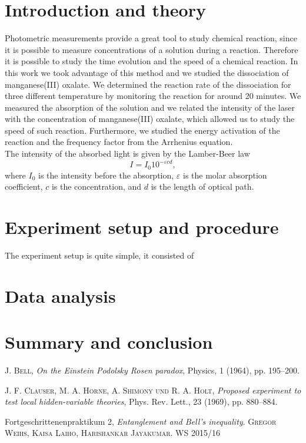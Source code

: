 \documentclass[a4paper,10pt]{article}
\begin{document}
\section{Introduction and theory}
Photometric measurements provide a great tool to study chemical reaction, since it is possible to measure concentrations of a solution during a reaction. Therefore it is possible to study the time evolution and the speed of a chemical reaction. In this work we took advantage of this method and we studied the dissociation of manganese(III) oxalate. We determined the reaction rate of the dissociation for three different temperature by monitoring the reaction for around 20 minutes. We measured the absorption of the solution and we related the intensity of the laser with the concentration of manganese(III) oxalate, which allowed us to study the speed of such reaction. Furthermore, we studied the energy activation of the reaction and the frequency factor from the Arrhenius equation.\\
The intensity of the absorbed light is given by the Lamber-Beer law
\[I = I_0 10^{-\varepsilon c d },\]
where $I_0$ is the intensity before the absorption, $\varepsilon$ is the molar absorption coefficient, $c$ is the concentration, and $d$ is the length of optical path.
\section{Experiment setup and procedure}
The experiment setup is quite simple, it consisted of 

\section{Data analysis}
\section{Summary and conclusion}

 \begin{thebibliography}{99}

     \textsc{J. Bell}, \textit{On the Einstein Podolsky Rosen paradox}, Physics, 1 (1964), pp. 195–200.

   \textsc{J. F. Clauser, M. A. Horne, A. Shimony und R. A. Holt}, \textit{Proposed experiment to
test local hidden-variable theories}, Phys. Rev. Lett., 23 (1969), pp. 880–884.

Fortgeschrittenenpraktikum 2, \textit{Entanglement and Bell’s inequality}. \textsc{Gregor Weihs, Kaisa Laiho, Harishankar Jayakumar}. WS 2015/16
\end{thebibliography}
\end{document}
